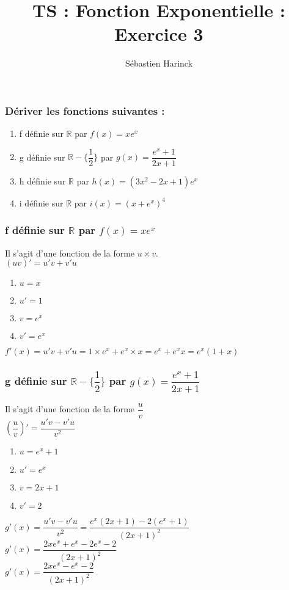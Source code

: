 \documentclass[t]{beamer}
\title{TS : Fonction Exponentielle : Exercice 3}
\author{Sébastien Harinck}
\institute{www.cours-futes.com}
\date{}
\begin{document}
\begin{frame}
\titlepage
\end{frame}

\begin{frame}
\frametitle{Dériver les fonctions suivantes :}
\begin{enumerate}
\item<+-> f définie sur $\mathbb{R} $ par $f(x) = xe^x$
\item<+-> g définie sur $\mathbb{R} - \lbrace \dfrac{1}{2}\rbrace $ par $g(x) = \dfrac{e^x+1}{2x+1}$
\item<+-> h définie sur $\mathbb{R} $ par $h(x) = (3x^2-2x+1)e^{x}$
\item<+-> i définie sur $\mathbb{R} $ par $i(x) = (x+e^x)^4$
\end{enumerate}
\end{frame}

\begin{frame}
\frametitle{f définie sur $\mathbb{R} $ par $f(x) = xe^x$}
\pause
Il s'agit d'une fonction de la forme $u \times v$. \\
\pause
\( (uv)' = u'v + v'u \)
\pause  
\begin{enumerate}
\item<+-> \( u = x \)
\item<+-> \( u'= 1 \)
\item<+-> \( v = e^x\)
\item<+-> \( v'= e^x \)
\end{enumerate}
\pause
\( f'(x) = u'v + v'u = 1 \times e^x + e^x \times x = e^x + e^xx = e^x (1+x)  \)
\end{frame}

\begin{frame}
\frametitle{g définie sur $\mathbb{R} - \lbrace \dfrac{1}{2}\rbrace $ par $g(x) = \dfrac{e^x+1}{2x+1}$}
\pause
Il s'agit d'une fonction de la forme $ \dfrac{u}{v}$ \\
\pause
\( (\dfrac{u}{v})' = \dfrac{u'v-v'u}{v^2} \)
\pause
\begin{enumerate}
\item<+-> \(u =  e^x+1 \)
\item<+-> \(u'= e^x \)
\item<+-> \(v = 2x+1 \)
\item<+-> \(v' = 2 \)
\end{enumerate}
\pause
\( g'(x)=  \dfrac{u'v-v'u}{v^2} = \dfrac{e^x(2x+1) - 2(e^x+1)}{(2x+1)^2}\) \\
\( g'(x) = \dfrac{2xe^x+e^x - 2e^x-2}{(2x+1)^2}\) \\
\( g'(x) = \dfrac{2xe^x-e^x-2}{(2x+1)^2}\)
\end{frame}
\end{document}
